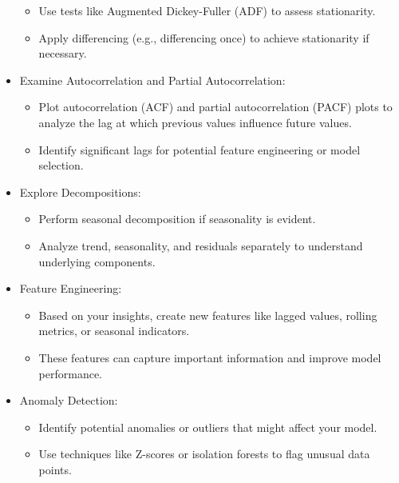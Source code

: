 \begin{itemize}
\begin{itemize}
                            \item Use tests like Augmented Dickey-Fuller (ADF) to assess stationarity.
                            \item Apply differencing (e.g., differencing once) to achieve stationarity if necessary.
                        \end{itemize}
                    \item Examine Autocorrelation and Partial Autocorrelation:
                        \begin{itemize}
                            \item Plot autocorrelation (ACF) and partial autocorrelation (PACF) plots to analyze the lag at which previous values influence future values.
                            \item Identify significant lags for potential feature engineering or model selection.
                        \end{itemize}
                    \item Explore Decompositions:
                        \begin{itemize}
                            \item Perform seasonal decomposition if seasonality is evident.
                            \item Analyze trend, seasonality, and residuals separately to understand underlying components.
                        \end{itemize}
                    \item Feature Engineering:
                        \begin{itemize}
                            \item Based on your insights, create new features like lagged values, rolling metrics, or seasonal indicators.
                            \item These features can capture important information and improve model performance.
                        \end{itemize}
                    \item Anomaly Detection:
                        \begin{itemize}
                            \item Identify potential anomalies or outliers that might affect your model.
                            \item Use techniques like Z-scores or isolation forests to flag unusual data points.

\end{itemize}
\end{itemize}
